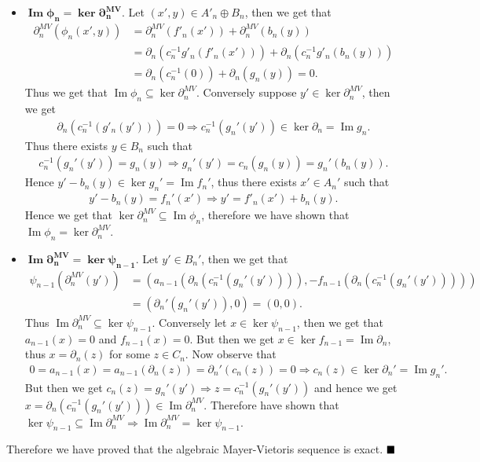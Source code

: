 \documentclass[11pt]{article}
\newcommand{\p}{\partial}
\begin{document}
\begin{itemize}
     \item $\mathbf{\operatorname{Im} \phi_n = \ker\p^{MV}_n}$. Let $(x',y) \in A'_n \oplus B_n$, then we get that 
     \begin{align*}
         \p_n^{MV}(\phi_n(x',y)) &= \p_n^{MV}(f'_n(x')) + \p^{MV}_n(b_n(y)) \\ 
         &= \p_n(c_n^{-1}g'_n(f'_n(x'))) + \p_n(c_n^{-1}g'_n(b_n(y))) \\ 
         &= \p_n(c_n^{-1}(0)) + \p_n(g_n(y)) = 0.
     \end{align*}
     Thus we get that $\operatorname{Im}\phi_n \subseteq \ker\p_n^{MV}$. Conversely suppose $y' \in \ker\p^{MV}_n$, then we get 
     \begin{align*}
         \p_n(c^{-1}_n(g'_n(y'))) = 0 \Rightarrow c_n^{-1}(g_n'(y')) \in \ker\p_n = \operatorname{Im} g_n.
     \end{align*}
     Thus there exists $y \in B_n$ such that 
     \begin{align*}
         c_n^{-1}(g_n'(y')) = g_n(y) \Rightarrow g_n'(y') = c_n(g_n(y)) = g_n'(b_n(y)).
     \end{align*}
     Hence $y' - b_n(y) \in \ker g_n' = \operatorname{Im} f_n'$, thus there exists $x' \in A_n'$ such that 
     \begin{align*}
         y' - b_n(y) = f_n'(x') \Rightarrow y' = f'_n(x') + b_n(y).
     \end{align*}
     Hence we get that $\ker\p^{MV}_n \subseteq \operatorname{Im}\phi_n$, therefore we have shown that $\operatorname{Im}\phi_n = \ker\p^{MV}_n$. 
 
     \item $\mathbf{\operatorname{Im} \p_n^{MV} = \ker\psi_{n-1}}$. Let $y' \in B_n'$, then we get that 
     \begin{align*}
         \psi_{n-1}(\p_n^{MV}(y')) &= (a_{n-1}(\p_n(c_n^{-1}(g_n'(y')))), -f_{n-1}(\p_n(c_n^{-1}(g_n'(y'))))) \\ 
         &= (\p_n'(g_n'(y')),0) = (0,0).
     \end{align*}
     Thus $\operatorname{Im}\p^{MV}_n \subseteq \ker\psi_{n-1}$. Conversely let $x \in \ker\psi_{n-1}$, then we get that $a_{n-1}(x) = 0$ and $f_{n-1}(x) = 0$. But then we get $x \in \ker f_{n-1} = \operatorname{Im} \p_n$, thus $x = \p_n(z)$ for some $z \in C_n$. Now observe that 
     \begin{align*}
         0 = a_{n-1}(x) = a_{n-1}(\p_n(z)) = \p_n'(c_n(z)) = 0 \Rightarrow c_n(z) \in \ker\p_n' = \operatorname{Im} g_n'. 
     \end{align*} 
     But then we get $c_n(z) = g_n'(y') \Rightarrow z = c_n^{-1}(g_n'(y'))$ and hence we get $x = \p_n(c_n^{-1}(g_n'(y'))) \in \operatorname{Im} \p^{MV}_n$. Therefore have shown that $\ker\psi_{n-1} \subseteq \operatorname{Im} \p_n^{MV} \Rightarrow \operatorname{Im} \p^{MV}_n = \ker\psi_{n-1}$.
 \end{itemize}
 Therefore we have proved that the \textsf{algebraic Mayer-Vietoris sequence} is exact. $\hfill \blacksquare$
\end{document}
